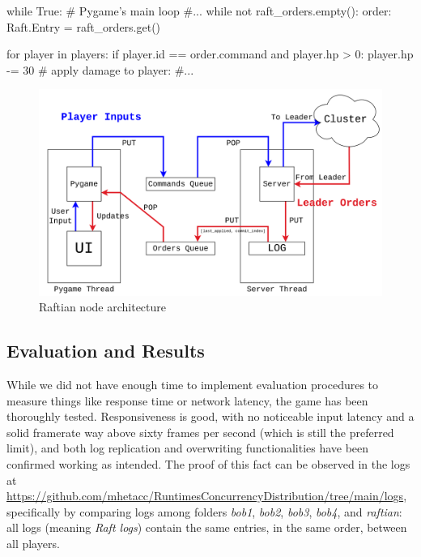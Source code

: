 \begin{python}[label={code:updateUI}, caption={Pygame periodically checks whether there are new orders and updates the UI accordingly}]
while True: # Pygame's main loop
    #...
    while not raft_orders.empty():
        order: Raft.Entry = raft_orders.get()

        for player in players:
            if player.id == order.command and player.hp > 0:
                player.hp -= 30  # apply damage to player:
                #...
\end{python}

\begin{figure}[h]
  \centering
  \includegraphics[width=\linewidth]{images/nodeArchitecture.png}
  
  \caption{Raftian node architecture}
  \label{fig:raftianArch}
\end{figure}

\subsection{Evaluation and Results}

While we did not have enough time to implement evaluation procedures to measure things like response time or network latency, the game has been thoroughly tested. Responsiveness is good, with no noticeable input latency and a solid framerate way above sixty frames per second (which is still the preferred limit), and both log replication and overwriting functionalities have been confirmed working as intended. The proof of this fact can be observed in the logs at \url{https://github.com/mhetacc/RuntimesConcurrencyDistribution/tree/main/logs}, specifically by comparing logs among folders \textit{bob1}, \textit{bob2}, \textit{bob3}, \textit{bob4}, and \textit{raftian}: all logs (meaning \textit{Raft logs}) contain the same entries, in the same order, between all players.
